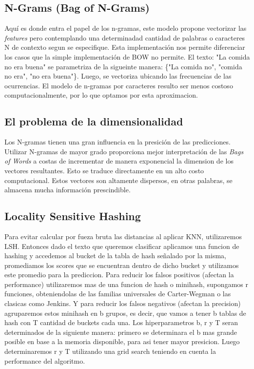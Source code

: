 \documentclass[a4paper,10pt]{article}
\begin{document}
	\subsection{N-Grams (Bag of N-Grams)}
	Aqu\'{i} es donde entra el papel de los n-gramas, este modelo propone vectorizar las \textit{features} pero contemplando una determinadad cantidad de palabras o caracteres N de contexto segun se especifique. Esta implementaci\'{o}n nos permite diferenciar los casos que la simple implementaci\'{o}n de BOW no permite.
	El texto: "La comida no era buena" se parametriza de la sigueinte manera: \{"La comida no", "comida no era", "no era buena"\}. Luego, se vectoriza ubicando las frecuencias de las ocurrencias. El modelo de n-gramas por caracteres resulto ser menos costoso computacionalmente, por lo que optamos por esta aproximacion.
	
	\subsection{El problema de la dimensionalidad}
	Los N-gramas tienen una gran influencia en la presici\'{o}n de las predicciones. Utilizar N-gramas de mayor grado proporciona mejor interpretaci\'{o}n de las \textit{Bags of Words} a costas de incrementar de manera exponencial la dimension de los vectores resultantes. Esto se traduce directamente en un alto costo computacional. Estos vectores son altamente dispersos, en otras palabras, se almacena mucha informaci\'{o}n prescindible.

	
	\subsection{Locality Sensitive Hashing}
	
	Para evitar calcular por fueza bruta las distancias al aplicar KNN, utilizaremos LSH. Entonces dado el texto que queremos clasificar aplicamos una funcion de hashing y accedemos al bucket de la tabla de hash se\~{n}alado por la misma, promediamos los scores que se encuentran dentro de dicho bucket y utilizamos este promedio para la prediccion. Para reducir los falsos positivos (afectan la performance) utilizaremos mas de una funcion de hash o minihash, supongamos r funciones, obteniendolas de las familias universales de Carter-Wegman o las clasicas como Jenkins. Y para reducir los falsos negativos (afectan la precision) agruparemos estos minihash en b grupos, es decir, que vamos a tener b tablas de hash con T cantidad de buckets cada una.
	 Los hiperparametros b, r y T seran determinados de la siguiente manera: primero se determinara el b mas grande posible en base a la memoria disponible, para asi tener mayor presicion. Luego determinaremos r y T utilizando una grid search teniendo en cuenta la performance del algoritmo.
\end{document}
